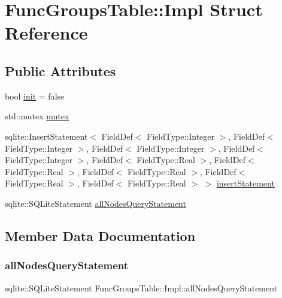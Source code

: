 \hypertarget{struct_func_groups_table_1_1_impl}{}\section{Func\+Groups\+Table\+::Impl Struct Reference}
\label{struct_func_groups_table_1_1_impl}
\subsection*{Public Attributes}
\begin{DoxyCompactItemize}
\item 
bool \mbox{\hyperlink{struct_func_groups_table_1_1_impl_a5e07c7511997a9a380824a78bd64bf8a}{init}} = false
\item 
std\+::mutex \mbox{\hyperlink{struct_func_groups_table_1_1_impl_aa67d42c38cac704731ee0e0558fc4bd3}{mutex}}
\item 
sqlite\+::\+Insert\+Statement$<$ Field\+Def$<$ Field\+Type\+::\+Integer $>$, Field\+Def$<$ Field\+Type\+::\+Integer $>$, Field\+Def$<$ Field\+Type\+::\+Integer $>$, Field\+Def$<$ Field\+Type\+::\+Integer $>$, Field\+Def$<$ Field\+Type\+::\+Real $>$, Field\+Def$<$ Field\+Type\+::\+Real $>$, Field\+Def$<$ Field\+Type\+::\+Real $>$, Field\+Def$<$ Field\+Type\+::\+Real $>$, Field\+Def$<$ Field\+Type\+::\+Real $>$ $>$ \mbox{\hyperlink{struct_func_groups_table_1_1_impl_a81e61b0d9f088e4ebf70648a96c99504}{insert\+Statement}}
\item 
sqlite\+::\+S\+Q\+Lite\+Statement \mbox{\hyperlink{struct_func_groups_table_1_1_impl_affea30e12be5f1cc4605fdb61250e80c}{all\+Nodes\+Query\+Statement}}
\end{DoxyCompactItemize}


\subsection{Member Data Documentation}
\mbox{\label{struct_func_groups_table_1_1_impl_affea30e12be5f1cc4605fdb61250e80c}} 
\subsubsection{\texorpdfstring{allNodesQueryStatement}{allNodesQueryStatement}}
{\footnotesize\ttfamily sqlite\+::\+S\+Q\+Lite\+Statement Func\+Groups\+Table\+::\+Impl\+::all\+Nodes\+Query\+Statement}


